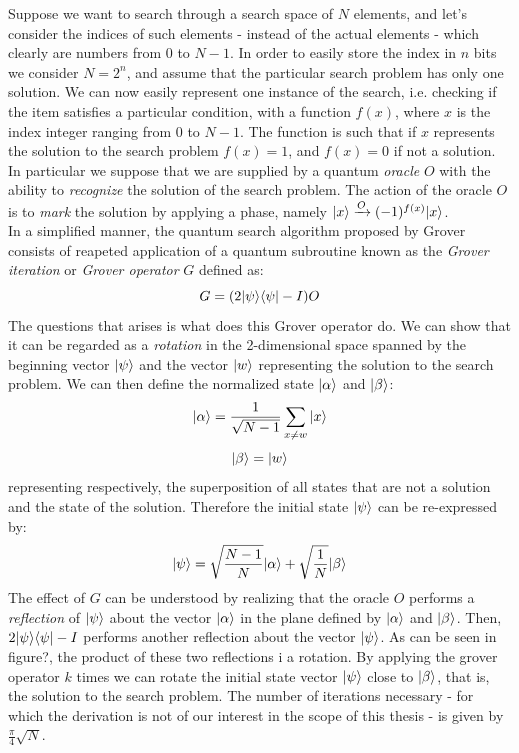 \noindent
Suppose we want to search through a search space of $N$ elements, and let's consider the indices of such elements - instead of the actual elements - which clearly are numbers from 0 to $N-1$. In order to easily store the index in $n$ bits we consider $N=2^n$, and assume that the particular search problem has only one solution. We can now easily represent one instance of the search, i.e. checking if the item satisfies a particular condition, with a function $f(x)$, where $x$ is the index integer ranging from 0 to $N-1$. The function is such that if $x$ represents the solution to the search problem $f(x)=1$, and $f(x)=0$ if not a solution. In particular we suppose that we are supplied by a quantum \textit{oracle} $O$ with the ability to \textit{recognize} the solution of the search problem. The action of the oracle $O$ is to \textit{mark} the solution by applying a phase, namely ${|{x}\rangle}\xrightarrow{O}(-1)^{f(x)}{|{x}\rangle}$. \\ In a simplified manner, the quantum search algorithm proposed by Grover consists of reapeted application of a quantum subroutine known as the \textit{Grover iteration} or \textit{Grover operator} $G$ defined as:
\begin{equation}
  G = (2{|{\psi}\rangle}{\langle{\psi}|}-I)O
\end{equation}
The questions that arises is what does this Grover operator do. We can show that it can be regarded as a \textit{rotation} in the 2-dimensional space spanned by the beginning vector ${|{\psi}\rangle}$ and the vector ${|{w}\rangle}$ representing the solution to the search problem. We can then define the normalized state ${|{\alpha}\rangle}$ and ${|{\beta}\rangle}$:
\begin{equation}
    {|{\alpha}\rangle} = \frac{1}{\sqrt{N-1}}\sum_{x\neq w}{|{x}\rangle}
\end{equation}
\vspace{-0.5cm}
\begin{equation}
  {|{\beta}\rangle} = {|{w}\rangle}
\end{equation}
representing respectively, the superposition of all states that are not a solution and the state of the solution. Therefore the initial state ${|{\psi}\rangle}$ can be re-expressed by:
\begin{equation}
  {|{\psi}\rangle}= \sqrt{\frac{N-1}{N}}{|{\alpha}\rangle} + \sqrt{\frac{1}{N}}{|{\beta}\rangle}
\end{equation}
The effect of $G$ can be understood by realizing that the oracle $O$ performs a \textit{reflection} of ${|{\psi}\rangle}$ about the vector ${|{\alpha}\rangle}$ in the plane defined by ${|{\alpha}\rangle}$ and ${|{\beta}\rangle}$. Then, $2{|{\psi}\rangle}{\langle{\psi}|}-I$ performs another reflection about the vector ${|{\psi}\rangle}$. As can be seen in figure?, the product of these two reflections i a rotation. By applying the grover operator $k$ times we can rotate the initial state vector ${|{\psi}\rangle}$ close to ${|{\beta}\rangle}$, that is, the solution to the search problem. The number of iterations necessary - for which the derivation is not of our interest in the scope of this thesis - is given by $\frac{\pi}{4}\sqrt{N}$.
